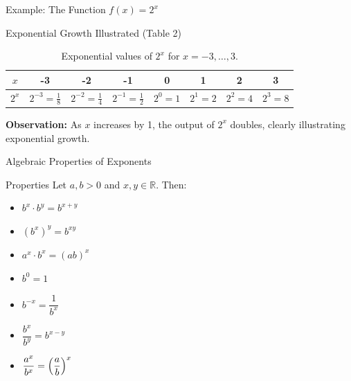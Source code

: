 \documentclass{beamer}
\begin{document}
\begin{frame}{Example: The Function \(f(x)=2^x\)}
  \begin{block}{Exponential Growth Illustrated (Table 2)}
    \begin{table}[ht]
      \centering
      \begin{tabular}{|c|c|c|c|c|c|c|c|}
        \hline
        \(x\)      & -3 & -2 & -1 & 0 & 1 & 2 & 3 \\ \hline
        \(2^x\) & \(2^{-3}=\frac{1}{8}\) & \(2^{-2}=\frac{1}{4}\) & \(2^{-1}=\frac{1}{2}\) & \(2^0=1\) & \(2^1=2\) & \(2^2=4\) & \(2^3=8\) \\ \hline
      \end{tabular}
      \caption{Exponential values of \(2^x\) for \(x=-3,\dots,3\).}
    \end{table}
  \end{block}
  \vspace{1em}
  \textbf{Observation:} As \(x\) increases by 1, the output of \(2^x\) doubles, clearly illustrating exponential growth.
\end{frame}




\begin{frame}{Algebraic Properties of Exponents}
  \begin{block}{Properties}
    Let \(a, b > 0\) and \(x, y \in \mathbb{R}\). Then:
    \begin{itemize}
      \item \(b^x \cdot b^y = b^{x+y}\)
      \item \((b^x)^y = b^{xy}\)
      \item \(a^x \cdot b^x = (ab)^x\)
      \item \(b^0 = 1\)
      \item \(b^{-x} = \dfrac{1}{b^x}\)
      \item \(\dfrac{b^x}{b^y} = b^{x-y}\)
      \item \(\dfrac{a^x}{b^x} = \Bigl(\dfrac{a}{b}\Bigr)^x\)
    \end{itemize}
  \end{block}
\end{frame}
\end{document}
